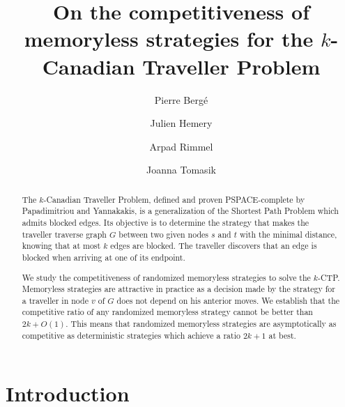 \documentclass[preprint]{elsarticle}
\newcommand{\kctp}{$k$-CTP}
\begin{document}
\title{On the competitiveness of memoryless strategies for the $k$-Canadian Traveller Problem}
\author[upsud]{Pierre Berg\'e }
\author[upsud]{Julien Hemery}
\author[cs]{Arpad Rimmel}
\author[cs]{Joanna Tomasik}
\address[upsud]{LRI, Universit\'e Paris-Sud, Universit\'e Paris-Saclay, 91405 Orsay Cedex, France}
\address[cs]{LRI, CentraleSup\' elec, Universit\'e Paris-Saclay, 91405 Orsay Cedex, France}

\begin{abstract}
The $k$-Canadian Traveller Problem, defined and proven PSPACE-complete by Papadimitriou and Yannakakis, is a generalization of the Shortest Path Problem which admits blocked edges. Its objective is to determine the strategy that makes the traveller traverse graph $G$ between two given nodes $s$ and $t$ with the minimal distance, knowing that at most $k$ edges are blocked. The traveller discovers that an edge is blocked when arriving at one of its endpoint. 
 
We study the competitiveness of randomized memoryless strategies to solve the \kctp . Memoryless strategies are attractive in practice as a decision made by the strategy for a traveller in node $v$ of $G$ does not depend on his anterior moves. We establish that the competitive ratio of any randomized memoryless strategy cannot be better than $2k + O\left(1\right)$. This means that randomized memoryless strategies are asymptotically as competitive as deterministic strategies which achieve a ratio $2k+1$ at best.
\end{abstract}

\maketitle


\section{Introduction}
\end{document}
